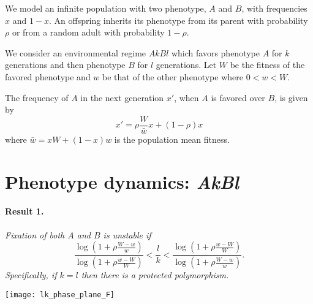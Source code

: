 \documentclass[a0,landscape]{a0poster}
\begin{document}
\begin{multicols}{4}
We model an infinite population with two phenotype, $A$ and $B$, with frequencies $x$ and $1-x$.
An offspring inherits its phenotype from its parent with probability $\rho$ or from a random adult with probability $1-\rho$.

We consider an environmental regime $AkBl$ which favors phenotype $A$ for $k$ generations and then phenotype $B$ for $l$ generations.
Let $W$ be the fitness of the favored phenotype and $w$ be that of the other phenotype where $0<w<W$.

The frequency of $A$ in the next generation $x'$, when $A$ is \mbox{favored} over $B$, is given by
\begin{equation}
x' = \rho \frac{W}{\bar{w}}x + (1-\rho) x
\end{equation}
where $\bar{w}=xW + (1-x)w$ is the population mean fitness. 


%
%

\section*{Phenotype dynamics: \emph{AkBl}}

\paragraph*{Result 1.}\textit{Fixation of both $A$ and $B$ is unstable if
\begin{equation}
\frac{\log(1+\rho \frac{W-w}{w})}{\log(1+\rho \frac{w-W}{W})} < 
\frac{l}{k} <
\frac{\log(1+\rho \frac{w-W}{W})}{\log(1+\rho \frac{W-w}{w})}.
\end{equation} 
Specifically, if $k=l$ then there is a protected polymorphism.}

\begin{center}\vspace{1cm}
\texttt{[image: lk\_phase\_plane\_F]}
\end{center}\vspace{1cm}


\end{multicols}
\end{document}
